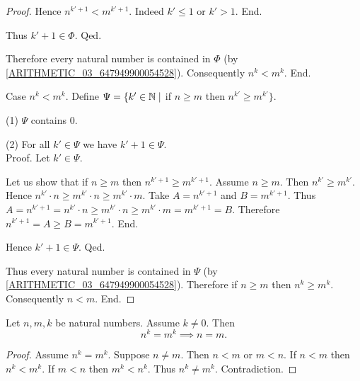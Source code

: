\documentclass[10pt]{article}
\begin{document}
\begin{forthel}
\begin{proof}
            Hence $n^{k' + 1} < m^{k' + 1}$.
            Indeed $k' \leq 1$ or $k' > 1$.
          End.

          Thus $k' + 1 \in \Phi$.
        Qed.

        Therefore every natural number is contained in $\Phi$ (by \cref{ARITHMETIC_03_647949900054528}).
        Consequently $n^{k} < m^{k}$.
      End.

      Case $n^{k} < m^{k}$.
        Define $\Psi = \{ k' \in \mathbb{N} \mid$ if $n \geq m$ then
        $n^{k'} \geq m^{k'} \}$.

        (1) $\Psi$ contains $0$.

        (2) For all $k' \in \Psi$ we have $k' + 1 \in \Psi$. \\
        Proof.
          Let $k' \in \Psi$.

          Let us show that if $n \geq m$ then $n^{k' + 1} \geq m^{k' + 1}$.
            Assume $n \geq m$.
            Then $n^{k'} \geq m^{k'}$.
            Hence $n^{k'} \cdot n \geq m^{k'} \cdot n \geq m^{k'} \cdot m$.
            Take $A = n^{k' + 1}$ and $B = m^{k' + 1}$. %
            Thus $A
              = n^{k' + 1}
              = n^{k'} \cdot n
              \geq m^{k'} \cdot n
              \geq m^{k'} \cdot m
              = m^{k' + 1}
              = B$.
            Therefore $n^{k' + 1} = A \geq B = m^{k' + 1}$.
          End.

          Hence $k' + 1 \in \Psi$.
        Qed.

        Thus every natural number is contained in $\Psi$ (by \cref{ARITHMETIC_03_647949900054528}).
        Therefore if $n \geq m$ then $n^{k} \geq m^{k}$.
        Consequently $n < m$.
      End.
    \end{proof}
  \end{forthel}

  \begin{forthel}
    \begin{corollary}
      Let $n, m, k$ be natural numbers.
      Assume $k \neq 0$.
      Then \[ n^{k} = m^{k} \implies n = m. \]
    \end{corollary}
    \begin{proof}
      Assume $n^{k} = m^{k}$.
      Suppose $n \neq m$.
      Then $n < m$ or $m < n$.
      If $n < m$ then $n^{k} < m^{k}$.
      If $m < n$ then $m^{k} < n^{k}$.
      Thus $n^{k} \neq m^{k}$.
      Contradiction.
    \end{proof}
  \end{forthel}
\end{document}

